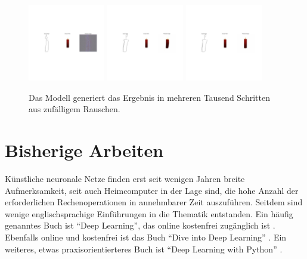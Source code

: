 \begin{figure}[h]
	\centering
	\includegraphics[width=0.3\textwidth]{bilder/0.jpg}
	\includegraphics[width=0.3\textwidth]{bilder/1.jpg}
	\includegraphics[width=0.3\textwidth]{bilder/15.jpg}
	\caption[Verschiedene Trainingsschritte]{Das Modell generiert das Ergebnis in mehreren Tausend Schritten aus zufälligem Rauschen.}
	\label{fig:trainingsteps}
\end{figure}

\section{Bisherige Arbeiten}
\label{sec:related}
Künstliche neuronale Netze finden erst seit wenigen Jahren breite Aufmerksamkeit, seit auch Heimcomputer in der Lage sind, die hohe Anzahl der erforderlichen Rechenoperationen in annehmbarer Zeit auszuführen. Seitdem sind wenige englischsprachige Einführungen in die Thematik entstanden. Ein häufig genanntes Buch ist ``Deep Learning'', das online kostenfrei zugänglich ist \cite{goodfellow2016deeplearning}. Ebenfalls online und kostenfrei ist das Buch ``Dive into Deep Learning'' \cite{zhang2020dive}. Ein weiteres, etwas praxisorientierteres Buch ist ``Deep Learning with Python'' \cite{chollet2021deep}.

